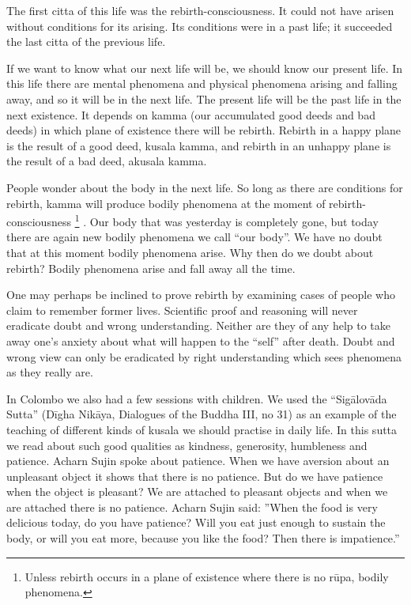 The first citta of this life was the rebirth-consciousness. It could not
have arisen without conditions for its arising. Its conditions were in a
past life; it succeeded the last citta of the previous life.

If we want to know what our next life will be, we should know our
present life. In this life there are mental phenomena and physical
phenomena arising and falling away, and so it will be in the next life.
The present life will be the past life in the next existence. It depends
on kamma (our accumulated good deeds and bad deeds) in which plane of
existence there will be rebirth. Rebirth in a happy plane is the result
of a good deed, kusala kamma, and rebirth in an unhappy plane is the
result of a bad deed, akusala kamma.

People wonder about the body in the next life. So long as there are
conditions for rebirth, kamma will produce bodily phenomena at the
moment of rebirth-consciousness
\footnote{Unless rebirth occurs in a plane
of existence where there is no rūpa, bodily phenomena.}
. Our body that was yesterday is completely gone, but today there are
again new bodily phenomena we call ``our body''. We have no doubt that
at this moment bodily phenomena arise. Why then do we doubt about
rebirth? Bodily phenomena arise and fall away all the time.

One may perhaps be inclined to prove rebirth by examining cases of
people who claim to remember former lives. Scientific proof and
reasoning will never eradicate doubt and wrong understanding. Neither
are they of any help to take away one's anxiety about what will happen
to the ``self'' after death. Doubt and wrong view can only be eradicated
by right understanding which sees phenomena as they really are.

In Colombo we also had a few sessions with children. We used the
``Sigālovāda Sutta'' (Dīgha Nikāya, Dialogues of the Buddha III, no 31)
as an example of the teaching of different kinds of kusala we should
practise in daily life. In this sutta we read about such good qualities
as kindness, generosity, humbleness and patience. Acharn Sujin spoke
about patience. When we have aversion about an unpleasant object it
shows that there is no patience. But do we have patience when the object
is pleasant? We are attached to pleasant objects and when we are
attached there is no patience. Acharn Sujin said: ''When the food is
very delicious today, do you have patience? Will you eat just enough to
sustain the body, or will you eat more, because you like the food? Then
there is impatience.''

